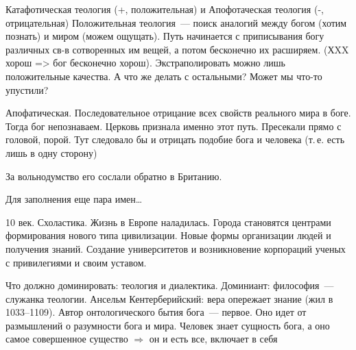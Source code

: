 Катафотическая теология (+, положительная) и Апофотаческая теология (-, отрицательная) 
Положительная теология~--- поиск аналогий между богом (хотим познать) и миром (можем ощущать). Путь начинается с приписывания богу различных св-в сотворенных им вещей, а потом бесконечно их расширяем. (ХXX хорош => бог бесконечно хорош). Экстраполировать можно лишь положительные качества. А что же делать с остальными? Может мы что-то упустили?

Апофатическая. Последовательное отрицание всех свойств реального мира в боге. Тогда бог непознаваем. Церковь признала именно этот путь. Пресекали прямо с головой, порой. Тут следовало бы и отрицать подобие бога и человека (т.\,е. есть лишь в одну сторону) 

За вольнодумство его сослали обратно в Британию.

Для заполнения еще пара имен\ldots

10 век. Схоластика.
Жизнь в Европе наладилась. Города становятся центрами формирования нового типа цивилизации. Новые формы организации людей и получения знаний. Создание университетов и возникновение корпораций ученых с привилегиями и своим уставом.

Что должно доминировать: теология и диалектика.
Доминиант: философия~--- служанка теологии.
Ансельм Кентерберийский: вера опережает знание (жил в 1033--1109). Автор онтологического бытия бога~--- первое. Оно идет от размышлений о разумности бога и мира. Человек знает сущность бога, а оно самое совершенное существо $\Rightarrow$ он и есть все, включает в себя
